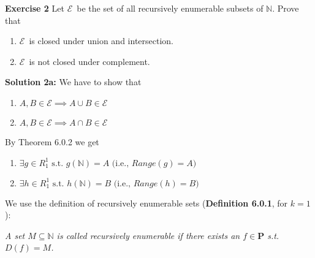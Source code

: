 \documentclass [11pt]{article}
\newcommand{\E}{\ensuremath{\mathcal{E}}}
\newcommand{\N}{\ensuremath{\mathbb{N}}}
\begin{document}
\bigskip
\noindent
\textbf{Exercise 2}  Let \E\ be the set of all recursively enumerable subsets of \N. Prove that 
\begin{enumerate}[label={\alph*)}] 
 \item \E\ is closed under union and intersection.
 \item \E\ is not closed under complement.
\end{enumerate}
\textbf{Solution 2a:}
We have to show that
\begin{enumerate}[label={\alph*)}] 
 \item $A, B \in \E \implies A\cup B \in \E$ 
 \item $A, B \in \E \implies A\cap B \in \E$ 
\end{enumerate}
By Theorem 6.0.2 we get 
\begin{enumerate}[label={\alph*)}] 
 \item $\exists g \in R_1^1 \text{ s.t.\ } g(\N) = A \text{ (i.e., } Range(g) = A)$
 \item $\exists h \in R_1^1 \text{ s.t.\ } h(\N) = B\text{ (i.e., } Range(h) = B)$
\end{enumerate}
We use the definition of recursively enumerable sets (\textbf{Definition 6.0.1}, for $k=1$):

\noindent
\emph{A set $M \subseteq \N$ is called recursively enumerable if there exists an $f \in \textbf{P}$ s.t.\ $D(f) = M$.}
\end{document}
